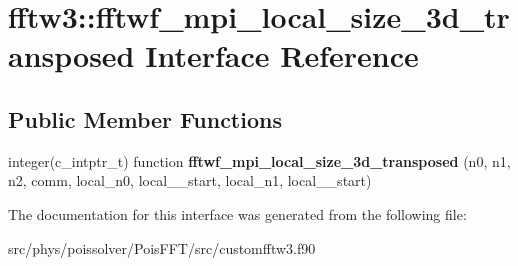 \hypertarget{interfacefftw3_1_1fftwf__mpi__local__size__3d__transposed}{}\section{fftw3\+:\+:fftwf\+\_\+mpi\+\_\+local\+\_\+size\+\_\+3d\+\_\+transposed Interface Reference}
\label{interfacefftw3_1_1fftwf__mpi__local__size__3d__transposed}
\subsection*{Public Member Functions}
\begin{DoxyCompactItemize}
\item 
integer(c\+\_\+intptr\+\_\+t) function {\bfseries fftwf\+\_\+mpi\+\_\+local\+\_\+size\+\_\+3d\+\_\+transposed} (n0, n1, n2, comm, local\+\_\+n0, local\+\_\+\_\+start, local\+\_\+n1, local\+\_\+\_\+start)\hypertarget{interfacefftw3_1_1fftwf__mpi__local__size__3d__transposed_ae8e1fb4874b0de631a0ab6d9668fdea5}{}\label{interfacefftw3_1_1fftwf__mpi__local__size__3d__transposed_ae8e1fb4874b0de631a0ab6d9668fdea5}

\end{DoxyCompactItemize}


The documentation for this interface was generated from the following file\+:\begin{DoxyCompactItemize}
\item 
src/phys/poissolver/\+Pois\+F\+F\+T/src/customfftw3.\+f90\end{DoxyCompactItemize}
